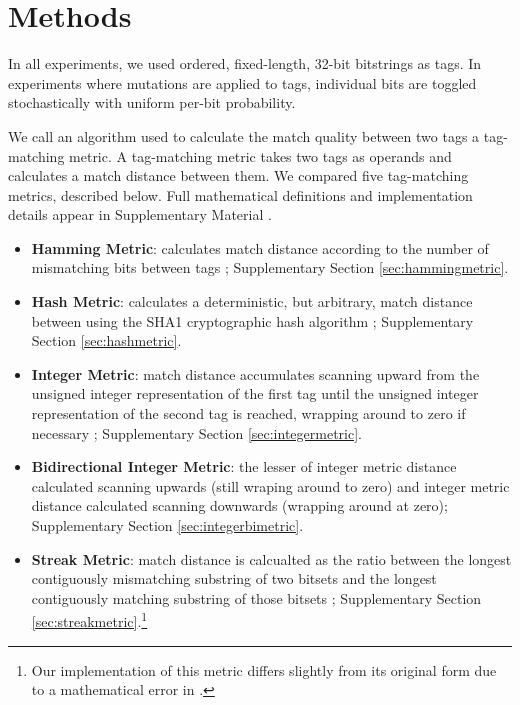 \section{Methods}

In all experiments, we used ordered, fixed-length, 32-bit bitstrings as tags.
In experiments where mutations are applied to tags, individual bits are toggled stochastically with uniform per-bit probability.

We call an algorithm used to calculate the match quality between two tags a tag-matching metric.
A tag-matching metric takes two tags as operands and calculates a match distance between them.
We compared five tag-matching metrics, described below.
Full mathematical definitions and implementation details appear in Supplementary Material \citep{Moreno_Ofria_2020}.

\begin{itemize}
  \item \textbf{Hamming Metric}: calculates match distance according to the number of mismatching bits between tags \citep{lalejini2019else, hamming1950error}; Supplementary Section \ref{sec:hammingmetric}.
  \item \textbf{Hash Metric}: calculates a deterministic, but arbitrary, match distance between using the SHA1 cryptographic hash algorithm \citep{eastlake2001us}; Supplementary Section \ref{sec:hashmetric}.
  \item \textbf{Integer Metric}: match distance accumulates scanning upward from the unsigned integer representation of the first tag until the unsigned integer representation of the second tag is reached, wrapping around to zero if necessary \citep{spector2011tag}; Supplementary Section \ref{sec:integermetric}.
  \item \textbf{Bidirectional Integer Metric}: the lesser of integer metric distance calculated scanning upwards (still wraping around to zero) and integer metric distance calculated scanning downwards (wrapping around at zero); Supplementary Section \ref{sec:integerbimetric}.
  \item \textbf{Streak Metric}: match distance is calcualted as the ratio between the longest contiguously mismatching substring of two bitsets and the longest contiguously matching substring of those bitsets \citep{downing2015intelligence}; Supplementary Section \ref{sec:streakmetric}.\footnote{Our implementation of this metric differs slightly from its original form due to a mathematical error in \citep{downing2015intelligence}.}
\end{itemize}

